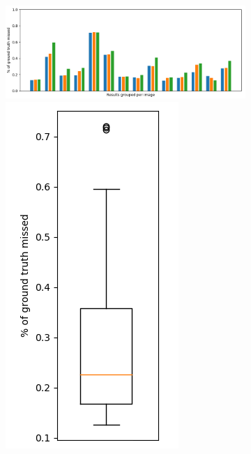 \documentclass[a4paper,titlepage,12pt]{article}
\begin{document}
\begin{figure}
	\centering
	\begin{subfigure}{\linewidth}
		\centering
		\includegraphics[width=0.8\columnwidth]{results/chart_surf2}
		\includegraphics[width=0.15\columnwidth]{results/chart_missbox}
		\caption{}
	\end{subfigure}


\end{figure}
\end{document}
